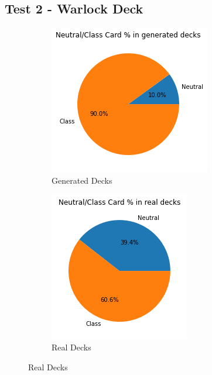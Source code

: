 \documentclass{report} %
\begin{document}
\subsection{Test 2 - Warlock Deck}
\begin{figure}[H]
\centering
\begin{subfigure}{.3\textwidth}
 \centering
 \includegraphics[width=.75\linewidth]{TestImages/NeutralSplitWarlockDecksFake}
 \caption{Generated Decks}
\end{subfigure}%
\begin{subfigure}{.3\textwidth}
 \centering
 \includegraphics[width=.75\linewidth]{TestImages/NeutralSplitWarlockDecksReal}
 \caption{Real Decks}
\end{subfigure}%

\end{figure}
\end{document}

